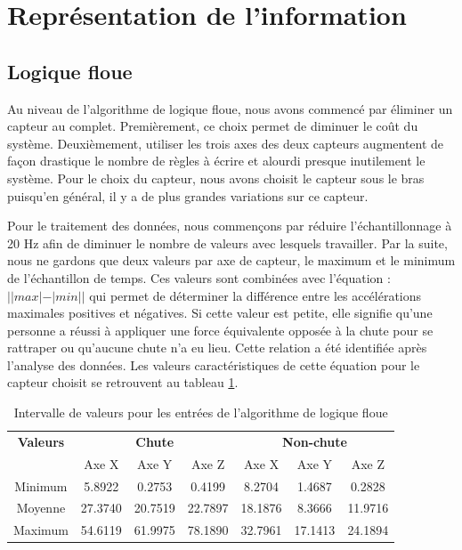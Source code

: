 \documentclass[12pt,letterpaper]{article}
\begin{document}
\section{Représentation de l'information}

\subsection{Logique floue}

Au niveau de l'algorithme de logique floue, nous avons commencé par éliminer un capteur au complet. Premièrement, ce choix permet de diminuer le coût du système. Deuxièmement, utiliser les trois axes des deux capteurs augmentent de façon drastique le nombre de règles à écrire et alourdi presque inutilement le système. Pour le choix du capteur, nous avons choisit le capteur sous le bras puisqu'en général, il y a de plus grandes variations sur ce capteur.

Pour le traitement des données, nous commençons par réduire l'échantillonnage à 20 Hz afin de diminuer le nombre de valeurs avec lesquels travailler. Par la suite, nous ne gardons que deux valeurs par axe de capteur, le maximum et le minimum de l'échantillon de temps. Ces valeurs sont combinées avec l'équation : $||max|-|min||$ qui permet de déterminer la différence entre les accélérations maximales positives et négatives. Si cette valeur est petite, elle signifie qu'une personne a réussi à appliquer une force équivalente opposée à la chute pour se rattraper ou qu'aucune chute n'a eu lieu. Cette relation a été identifiée après l'analyse des données. Les valeurs caractéristiques de cette équation pour le capteur choisit se retrouvent au tableau \ref{tbl:f_input_val}.

\begin{table}[h]
  \begin{center}
    \begin{tabular} {|c|c|c|c|c|c|c|}
        \hline
        \textbf{Valeurs} & \multicolumn{3}{|c|}{\textbf{Chute}} & \multicolumn{3}{|c|}{\textbf{Non-chute}} \\ \cline{2-7}
         & Axe X & Axe Y & Axe Z & Axe X & Axe Y & Axe Z \\
        \hline
        Minimum & 5.8922  & 0.2753  & 0.4199  & 8.2704  & 1.4687  & 0.2828 \\
        \hline
        Moyenne & 27.3740 & 20.7519 & 22.7897 & 18.1876 & 8.3666  & 11.9716 \\
        \hline
        Maximum & 54.6119 & 61.9975 & 78.1890 & 32.7961 & 17.1413 & 24.1894 \\
        \hline
    \end{tabular}
    \caption{Intervalle de valeurs pour les entrées de l'algorithme de logique floue}
    \label{tbl:f_input_val}
  \end{center}
\end{table}
\end{document}

